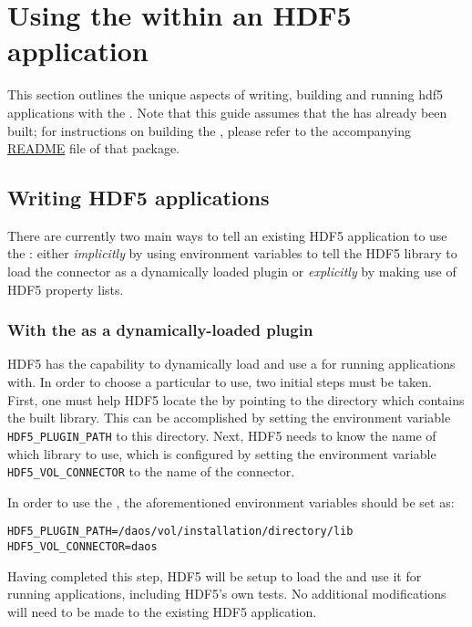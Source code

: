 \documentclass[../users_guide.tex]{subfiles}
\begin{document}
\section{Using the \dvc{} within an HDF5 application}

This section outlines the unique aspects of writing, building and running
\acrshort{hdf5} applications with the \dvc{}. Note that this guide assumes that
the \dvc{} has already
been built; for instructions on building the \dvc{}, please refer to
the accompanying \href{https://bitbucket.hdfgroup.org/projects/HDF5VOL/repos/daos-vol/browse/README.md}{README} file of that package.

\subsection{Writing HDF5 \dvc{} applications}

There are currently two main ways to tell an existing HDF5 application to use
the \dvc{}: either \textit{implicitly} by using environment
variables to tell the HDF5 library to load the connector as a dynamically loaded
plugin or \textit{explicitly} by making use of HDF5 property lists.

\subsubsection{With the \dvc{} as a dynamically-loaded plugin}

HDF5 has the capability to dynamically load and use a \vc{} for running
applications with. In order to choose a particular \vc{} to use, two
initial steps must be taken. First, one must help HDF5 locate the \vc{}
by pointing to the directory which contains the built library. This can be
accomplished by setting the environment variable \texttt{HDF5\_PLUGIN\_PATH} to
this directory. Next, HDF5 needs to know the name of which library to use, which
is configured by setting the environment variable \texttt{HDF5\_VOL\_CONNECTOR}
to the name of the connector.

In order to use the \dvc{}, the aforementioned environment variables 
should be set as:

\begin{verbatim}
HDF5_PLUGIN_PATH=/daos/vol/installation/directory/lib
HDF5_VOL_CONNECTOR=daos
\end{verbatim}

Having completed this step, HDF5 will be setup to load the \dvc{}
and use it for running applications, including HDF5's own tests.
No additional modifications will need to be made to the existing HDF5 application.
\end{document}
